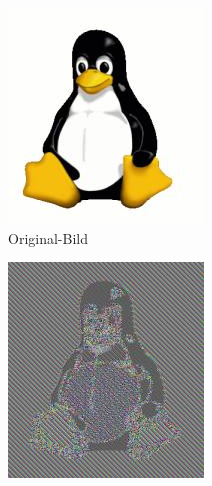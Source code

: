 \begin{figure}[h]
	\centering
	\begin{subfigure}[b]{.3\textwidth}
		\centering
		\includegraphics[width=\textwidth]{images/Tux.jpg}
		\caption{Original-Bild}
	\end{subfigure}
	\hfill
	\begin{subfigure}[b]{.3\textwidth}
		\centering
		\includegraphics[width=\textwidth]{images/Tux_ecb.jpg}

\end{subfigure}
\end{figure}
